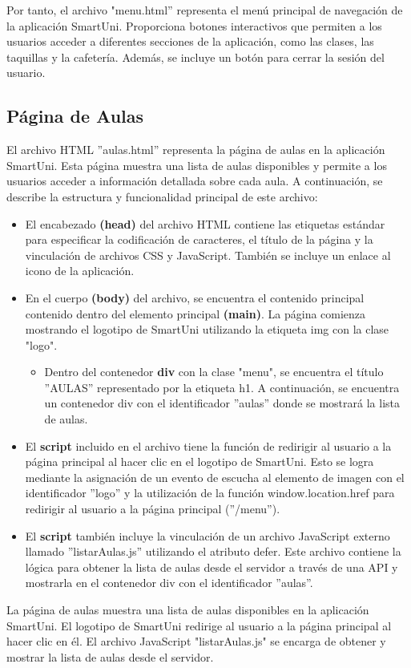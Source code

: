 \documentclass[12pt]{report}
\begin{document}
Por tanto, el archivo "menu.html'' representa el menú principal de navegación de la aplicación SmartUni. Proporciona botones interactivos que permiten a los usuarios acceder a diferentes secciones de la aplicación, como las clases, las taquillas y la cafetería. Además, se incluye un botón para cerrar la sesión del usuario.


\subsection{Página de Aulas}
El archivo HTML ''aulas.html'' representa la página de aulas en la aplicación SmartUni. Esta página muestra una lista de aulas disponibles y permite a los usuarios acceder a información detallada sobre cada aula. A continuación, se describe la estructura y funcionalidad principal de este archivo:

\begin{itemize}
    \item El encabezado \textbf{(head)} del archivo HTML contiene las etiquetas estándar para especificar la codificación de caracteres, el título de la página y la vinculación de archivos CSS y JavaScript. También se incluye un enlace al icono de la aplicación.

    \item En el cuerpo\textbf{ (body)} del archivo, se encuentra el contenido principal contenido dentro del elemento principal \textbf{(main)}. La página comienza mostrando el logotipo de SmartUni utilizando la etiqueta img con la clase "logo".

    \begin{itemize}
        \item Dentro del contenedor \textbf{div} con la clase "menu", se encuentra el título ''AULAS'' representado por la etiqueta h1. A continuación, se encuentra un contenedor div con el identificador ''aulas'' donde se mostrará la lista de aulas.
    \end{itemize}

    \item El \textbf{script } incluido en el archivo tiene la función de redirigir al usuario a la página principal al hacer clic en el logotipo de SmartUni. Esto se logra mediante la asignación de un evento de escucha al elemento de imagen con el identificador ''logo'' y la utilización de la función window.location.href para redirigir al usuario a la página principal (''/menu'').

    \item El\textbf{ script} también incluye la vinculación de un archivo JavaScript externo llamado ''listarAulas.js'' utilizando el atributo defer. Este archivo contiene la lógica para obtener la lista de aulas desde el servidor a través de una API y mostrarla en el contenedor div con el identificador ''aulas''.
\end{itemize}
 La página de aulas muestra una lista de aulas disponibles en la aplicación SmartUni. El logotipo de SmartUni redirige al usuario a la página principal al hacer clic en él. El archivo JavaScript "listarAulas.js" se encarga de obtener y mostrar la lista de aulas desde el servidor.
 
\end{document}
